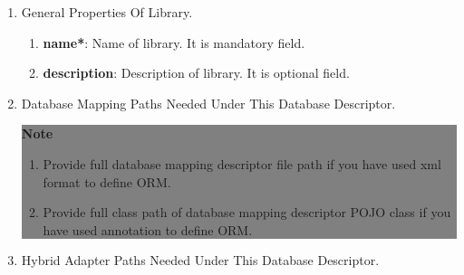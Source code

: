 \begin{enumerate}

	\item \small General Properties Of Library.
		
		\begin{enumerate}

			\item \small \textbf{name*}: Name of library. It is mandatory field.
			\item \small \textbf{description}: Description of library. It is optional field.
		
		\end{enumerate}

	\item \small Database Mapping Paths Needed Under This Database Descriptor.	

			\begin{center}
				\colorbox{grey}{
					\parbox[t]{.8\linewidth}{
						\fontsize{11pt}{11pt}\selectfont %
						\vspace*{0.1cm} %
		
						\hfill \textbf{Note} \\

						\hfill 

						\begin{enumerate}

							\item \small Provide full database mapping descriptor file path if you have used xml format to define ORM.

							\item \small Provide full class path of database mapping descriptor POJO class if you have used annotation to define ORM.
	
						\end{enumerate}

						\vspace*{0.0cm} %
					}
			}

			\end{center}

	
	\item \small Hybrid Adapter Paths Needed Under This Database Descriptor.

			\begin{center}
				\colorbox{grey}{
					\parbox[t]{.8\linewidth}{
						\fontsize{11pt}{11pt}\selectfont %
						\vspace*{0.1cm} %
		
}}
\end{center}
\end{enumerate}
